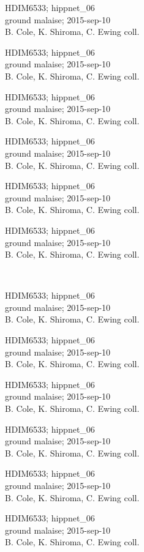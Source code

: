 \documentclass[2pt]{extarticle}
\begin{document}
\noindent
\parbox{0.16\textwidth}{\tiny \raggedright \rule[-0.3\baselineskip]{0pt}{10pt}HDIM6533; hippnet\_06\\ ground malaise; 2015-sep-10\\ B. Cole, K. Shiroma, C. Ewing coll.}
\parbox{0.16\textwidth}{\tiny \raggedright \rule[-0.3\baselineskip]{0pt}{10pt}HDIM6533; hippnet\_06\\ ground malaise; 2015-sep-10\\ B. Cole, K. Shiroma, C. Ewing coll.}
\parbox{0.16\textwidth}{\tiny \raggedright \rule[-0.3\baselineskip]{0pt}{10pt}HDIM6533; hippnet\_06\\ ground malaise; 2015-sep-10\\ B. Cole, K. Shiroma, C. Ewing coll.}
\parbox{0.16\textwidth}{\tiny \raggedright \rule[-0.3\baselineskip]{0pt}{10pt}HDIM6533; hippnet\_06\\ ground malaise; 2015-sep-10\\ B. Cole, K. Shiroma, C. Ewing coll.}
\parbox{0.16\textwidth}{\tiny \raggedright \rule[-0.3\baselineskip]{0pt}{10pt}HDIM6533; hippnet\_06\\ ground malaise; 2015-sep-10\\ B. Cole, K. Shiroma, C. Ewing coll.}
\parbox{0.16\textwidth}{\tiny \raggedright \rule[-0.3\baselineskip]{0pt}{10pt}HDIM6533; hippnet\_06\\ ground malaise; 2015-sep-10\\ B. Cole, K. Shiroma, C. Ewing coll.} \\ 
\vspace{0.001in} 

\noindent
\parbox{0.16\textwidth}{\tiny \raggedright \rule[-0.3\baselineskip]{0pt}{10pt}HDIM6533; hippnet\_06\\ ground malaise; 2015-sep-10\\ B. Cole, K. Shiroma, C. Ewing coll.}
\parbox{0.16\textwidth}{\tiny \raggedright \rule[-0.3\baselineskip]{0pt}{10pt}HDIM6533; hippnet\_06\\ ground malaise; 2015-sep-10\\ B. Cole, K. Shiroma, C. Ewing coll.}
\parbox{0.16\textwidth}{\tiny \raggedright \rule[-0.3\baselineskip]{0pt}{10pt}HDIM6533; hippnet\_06\\ ground malaise; 2015-sep-10\\ B. Cole, K. Shiroma, C. Ewing coll.}
\parbox{0.16\textwidth}{\tiny \raggedright \rule[-0.3\baselineskip]{0pt}{10pt}HDIM6533; hippnet\_06\\ ground malaise; 2015-sep-10\\ B. Cole, K. Shiroma, C. Ewing coll.}
\parbox{0.16\textwidth}{\tiny \raggedright \rule[-0.3\baselineskip]{0pt}{10pt}HDIM6533; hippnet\_06\\ ground malaise; 2015-sep-10\\ B. Cole, K. Shiroma, C. Ewing coll.}
\parbox{0.16\textwidth}{\tiny \raggedright \rule[-0.3\baselineskip]{0pt}{10pt}HDIM6533; hippnet\_06\\ ground malaise; 2015-sep-10\\ B. Cole, K. Shiroma, C. Ewing coll.} \\ 
\vspace{0.001in} 
\end{document}
